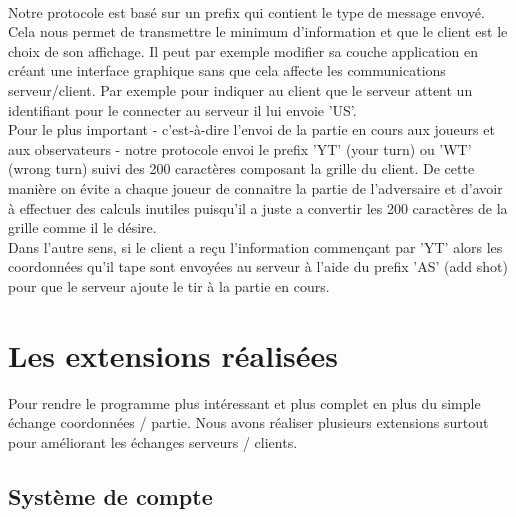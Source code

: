 \documentclass[12pt]{article}
\begin{document}
\textnormal{
\\Notre protocole est basé sur un prefix qui contient le type de message envoyé. Cela nous permet de transmettre le minimum d'information et que le client est le choix de son affichage. Il peut par exemple modifier sa couche application en créant une interface graphique sans que cela affecte les communications serveur/client. Par exemple pour indiquer au client que le serveur attent un identifiant pour le connecter au serveur il lui envoie 'US'.\\
Pour le plus important - c'est-à-dire l'envoi de la partie en cours aux joueurs et aux observateurs - notre protocole envoi le prefix 'YT' (your turn) ou 'WT' (wrong turn) suivi des 200 caractères composant la grille du client. De cette manière on évite a chaque joueur de connaitre la partie de l'adversaire et d'avoir à effectuer des calculs inutiles puisqu'il a juste a convertir les 200 caractères de la grille comme il le désire.\\
Dans l'autre sens, si le client a reçu l'information commençant par 'YT' alors les coordonnées qu'il tape sont envoyées au serveur à l'aide du prefix 'AS' (add shot) pour que le serveur ajoute le tir à la partie en cours.}

\section{Les extensions réalisées}

\textnormal{
Pour rendre le programme plus intéressant et plus complet en plus du simple échange coordonnées / partie. Nous avons réaliser plusieurs extensions surtout pour améliorant les échanges serveurs / clients.
}

\subsection{Système de compte}
\end{document}
